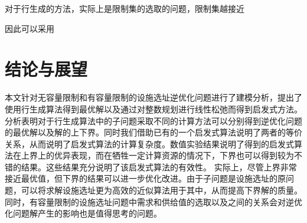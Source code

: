 \documentclass[UTF8]{article}
\begin{document}
对于行生成的方法，实际上是限制集的选取的问题，限制集越接近

因此可以采用

\section{结论与展望}
本文针对无容量限制和有容量限制的设施选址逆优化问题进行了建模分析，提出了使用行生成算法得到最优解以及通过对整数规划进行线性松弛而得到启发式方法。分析表明对于行生成算法中的子问题采取不同的计算方法可以分别得到逆优化问题的最优解以及解的上下界。同时我们借助已有的一个启发式算法说明了两者的等价关系，从而说明了启发式算法的计算复杂度。数值实验结果说明了得到的启发式算法在上界上的优异表现，而在牺牲一定计算资源的情况下，下界也可以得到较为不错的结果。这些结果充分说明了该启发式算法的有效性。
实际上，尽管上界非常接近最优值，但下界的结果可以进一步优化改进。由于子问题是设施选址的原问题，可以将求解设施选址更为高效的近似算法用于其中，从而提高下界解的质量。同时，有容量限制的设施选址问题中需求和供给值的选取以及之间的关系会对逆优化问题解产生的影响也是值得思考的问题。
\end{document}
